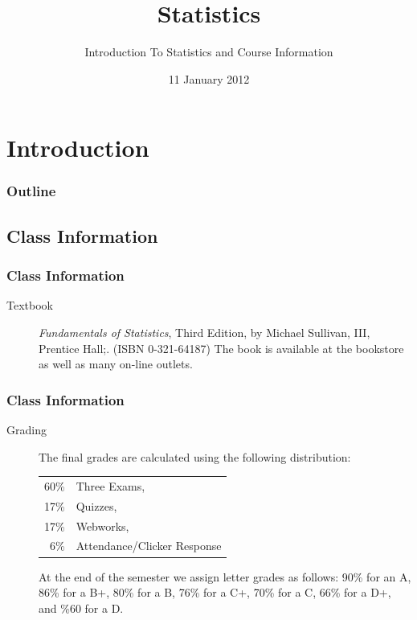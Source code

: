
\section{Introduction}

\title{Statistics}
\subtitle{Introduction To Statistics and Course Information}

\date{11 January 2012}

\begin{frame}
  \titlepage
\end{frame}

\begin{frame}
  \frametitle{Outline}
  \tableofcontents[pausesection,hideothersubsections,sectionstyle=show/hide]
\end{frame}


\subsection{Class Information}


\begin{frame}
  \frametitle{Class Information}

\begin{description}
\item[Textbook] {\em Fundamentals of Statistics}, Third Edition, by
  Michael Sullivan, III, Prentice Hall;. (ISBN 0-321-64187) The book
  is available at the bookstore as well as many on-line outlets.

\end{description}

\end{frame}


\begin{frame}
  \frametitle{Class Information}

\begin{description}
\item[Grading] %
  
  The final grades are calculated using the following distribution:
    \begin{tabular}[t]{rl}
      60\% & Three Exams, \\
      17\% & Quizzes, \\
      17\% & Webworks, \\
      6\%  & Attendance/Clicker Response \\
    \end{tabular}
  
    At the end of the semester we assign letter grades as follows:
    90\% for an A, 86\% for a B+, 80\% for a B, 76\% for a C+, 70\%
    for a C, 66\% for a D+, and \%60 for a D.
\end{description}

\end{frame}



